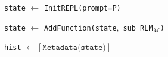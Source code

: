 \begin{algorithm}[H]
\LinesNotNumbered
\footnotesize
\caption{A recursive language model, around LLM $\mathcal{M}$, which itself acts as a ``language model''.}
\label{alg:rlm-call}

\texttt{state} $\gets$ \texttt{InitREPL(prompt=P)}\;

\texttt{state} $\gets$ \texttt{AddFunction(}\texttt{state},\, \textcolor{subrlmcolor}{\texttt{sub\_RLM}}\ensuremath{_{\mathcal{M}}}\texttt{)}\;

\texttt{hist} $\gets [\texttt{Metadata(state)}]$\;

\end{algorithm}
